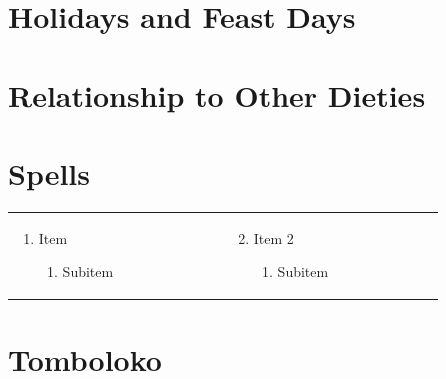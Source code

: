 \section{Holidays and Feast Days}
\section{Relationship to Other Dieties}


\section{Spells}
\renewcommand{\labelenumii}{\arabic{enumii}.}
\begin{tabular}{@{} p{0.25\linewidth} p{0.25\linewidth}}
\begin{enumerate}
	\item Item
	\begin{enumerate}
		\item Subitem
	\end{enumerate}
\end{enumerate} &
\begin{enumerate}
	\setcounter{enumi}{1}
	\item Item 2
	\begin{enumerate}
		\item Subitem
	\end{enumerate}
\end{enumerate} 
\end{tabular}
\pagebreak

\section{Tomboloko}

